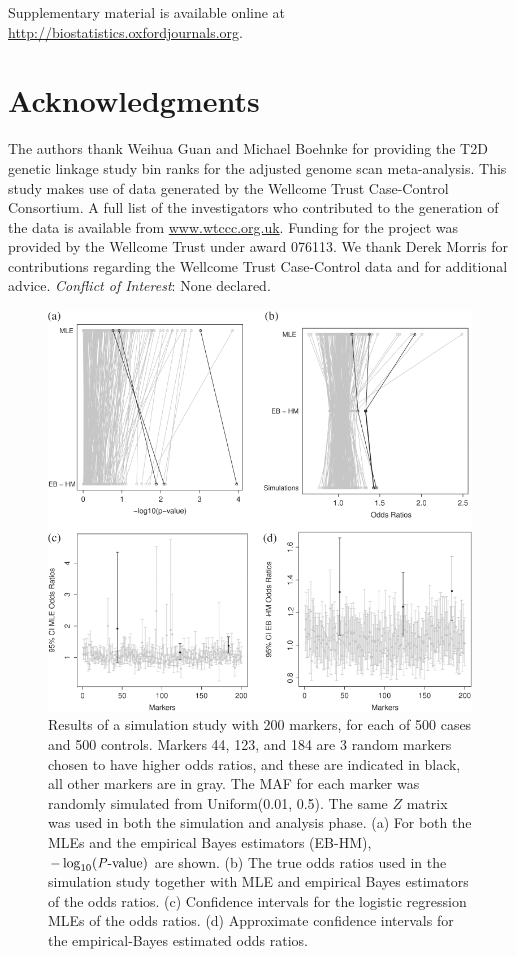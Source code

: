\documentclass[oupdraft]{bio}
\begin{document}
Supplementary material is available online at
\url{http://biostatistics.oxfordjournals.org}.


\section*{Acknowledgments}

The authors thank Weihua Guan and Michael Boehnke for providing
the T2D genetic linkage study bin ranks for the adjusted genome
scan meta-analysis. This study makes use of data generated by
the Wellcome Trust Case-Control Consortium. A full list of the
investigators who contributed to the generation of the data is
available from %
\url{www.wtccc.org.uk}.
Funding for the project was provided by the Wellcome Trust
under award 076113. We thank Derek Morris for contributions
regarding the Wellcome Trust Case-Control data and for
additional advice.
{\it Conflict of Interest}: None declared.






\begin{figure}[!p]
\centering\includegraphics{fig1}
\caption{Results of a simulation study with 200 markers,
for each of 500 cases and 500 controls. Markers 44, 123,
and 184 are 3 random markers chosen to have higher odds
ratios, and these are indicated in black, all other markers
are in gray. The MAF for each marker was randomly simulated
from Uniform(0.01, 0.5). The same $Z$ matrix was used in both
the simulation and analysis phase. (a) For both the MLEs
and the empirical Bayes estimators (EB-HM),
$-\log_{10} (\hbox{\textit{P}-value})$ are shown.
(b) The true odds ratios used in the simulation study
together with MLE and empirical Bayes estimators of the odds
ratios. (c) Confidence intervals for the logistic regression
MLEs of the odds ratios. (d) Approximate confidence intervals
for the empirical-Bayes estimated odds ratios.}
\label{Fig1}
\end{figure}
\end{document}
